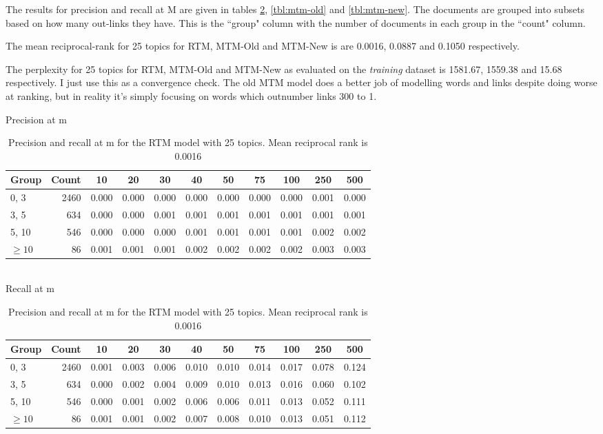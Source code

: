 The results for precision and recall at M are given in tables \ref{tbl:rtm}, \ref{tbl:mtm-old} and \ref{tbl:mtm-new}. The documents are grouped into subsets based on how many out-links they have. This is the ``group" column with the number of documents in each group in the ``count" column.

The mean reciprocal-rank for 25 topics for RTM, MTM-Old and MTM-New is are 0.0016, 0.0887 and 0.1050 respectively.

The perplexity for 25 topics for RTM, MTM-Old and MTM-New as evaluated on the \emph{training} dataset is 1581.67, 1559.38 and 15.68 respectively. I just use this as a convergence check. The old MTM model does a better job of modelling words and links despite doing worse at ranking, but in reality it's simply focusing on words which outnumber links 300 to 1.

\begin{table}{\small
Precision at m\\
\begin{tabular}{| l | r || c | c | c | c | c | c | c | c | c |}\hline
 Group    & Count &    10 &    20 &    30 &    40 &    50 &    75 &   100 &   250 &   500  \\
\hline
  0,    3 &      2460 & 0.000 & 0.000 & 0.000 & 0.000 & 0.000 & 0.000 & 0.000 & 0.001 & 0.000  \\
  3,    5 &       634 & 0.000 & 0.000 & 0.001 & 0.001 & 0.001 & 0.001 & 0.001 & 0.001 & 0.001  \\
  5,   10 &       546 & 0.000 & 0.000 & 0.000 & 0.001 & 0.001 & 0.001 & 0.001 & 0.002 & 0.002  \\
 $\geq 10$ &        86 & 0.001 & 0.001 & 0.001 & 0.002 & 0.002 & 0.002 & 0.002 & 0.003 & 0.003  \\
\hline\end{tabular}\\

Recall at m\\
\begin{tabular}{| l | r || c | c | c | c | c | c | c | c | c |}\hline
 Group    & Count &    10 &    20 &    30 &    40 &    50 &    75 &   100 &   250 &   500  \\ \hline
  0,    3 &      2460 & 0.001 & 0.003 & 0.006 & 0.010 & 0.010 & 0.014 & 0.017 & 0.078 & 0.124  \\
  3,    5 &       634 & 0.000 & 0.002 & 0.004 & 0.009 & 0.010 & 0.013 & 0.016 & 0.060 & 0.102  \\
  5,   10 &       546 & 0.000 & 0.001 & 0.002 & 0.006 & 0.006 & 0.011 & 0.013 & 0.052 & 0.111  \\
 $\geq 10$ &        86 & 0.001 & 0.001 & 0.002 & 0.007 & 0.008 & 0.010 & 0.013 & 0.051 & 0.112  \\
\hline\end{tabular}
\caption{Precision and recall at m for the RTM model with 25 topics. Mean reciprocal rank is 0.0016}\label{tbl:rtm}
}\end{table}

